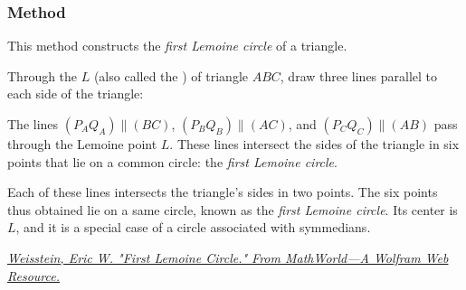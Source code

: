 


\subsubsection{Method } %
\label{ssub:method_triangle_first_lemoine_circle}

This method constructs the \emph{first Lemoine circle} of a triangle.

Through the  $L$ (also called the ) of triangle $ABC$, draw three lines parallel to each side of the triangle:

The lines \( (P_AQ_A) \parallel (BC) \), \( (P_BQ_B) \parallel (AC) \), and \( (P_CQ_C) \parallel (AB) \) pass through the Lemoine point \( L \). These lines intersect the sides of the triangle in six points that lie on a common circle: the \emph{first Lemoine circle}.

Each of these lines intersects the triangle’s sides in two points. The six points thus obtained lie on a same circle, known as the \emph{first Lemoine circle}. Its center is $L$, and it is a special case of a circle associated with symmedians.

\begin{flushright}
\href{https://mathworld.wolfram.com/FirstLemoineCircle.html}
{\textit{Weisstein, Eric W. "First Lemoine Circle." From MathWorld—A Wolfram Web Resource.}}
\end{flushright}

\vspace{1em}


\begin{minipage}{.5\textwidth}
\end{minipage}
\begin{minipage}{.5\textwidth}
\begin{tkzexample}
\end{tkzexample}
\end{minipage}

